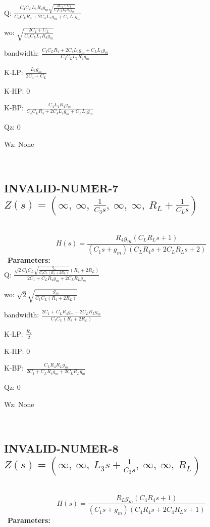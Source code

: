 \documentclass{article}
\begin{document}
Q: $\frac{C_{4} C_{L} L_{1} R_{4} g_{m} \sqrt{\frac{2 C_{4} + C_{L}}{C_{4} C_{L} L_{1} R_{4} g_{m}}}}{C_{4} C_{L} R_{4} + 2 C_{4} L_{1} g_{m} + C_{L} L_{1} g_{m}}$\ 

wo: $\sqrt{\frac{2 C_{4} + C_{L}}{C_{4} C_{L} L_{1} R_{4} g_{m}}}$\ 

bandwidth: $\frac{C_{4} C_{L} R_{4} + 2 C_{4} L_{1} g_{m} + C_{L} L_{1} g_{m}}{C_{4} C_{L} L_{1} R_{4} g_{m}}$\ 

K-LP: $\frac{L_{1} g_{m}}{2 C_{4} + C_{L}}$\ 

K-HP: $0$\ 

K-BP: $\frac{C_{4} L_{1} R_{4} g_{m}}{C_{4} C_{L} R_{4} + 2 C_{4} L_{1} g_{m} + C_{L} L_{1} g_{m}}$\ 

Qz: $0$\ 

Wz: $\text{None}$\ 

\ 

\subsection{INVALID-NUMER-7 $Z(s) = \left( \infty, \  \infty, \  \frac{1}{C_{3} s}, \  \infty, \  \infty, \  R_{L} + \frac{1}{C_{L} s}\right)$ } \ 
\textbf{\[H(s) = \frac{R_{4} g_{m} \left(C_{L} R_{L} s + 1\right)}{\left(C_{1} s + g_{m}\right) \left(C_{L} R_{4} s + 2 C_{L} R_{L} s + 2\right)}\] } \ 
\textbf{Parameters:}\\ 

Q: $\frac{\sqrt{2} C_{1} C_{L} \sqrt{\frac{g_{m}}{C_{1} C_{L} \left(R_{4} + 2 R_{L}\right)}} \left(R_{4} + 2 R_{L}\right)}{2 C_{1} + C_{L} R_{4} g_{m} + 2 C_{L} R_{L} g_{m}}$\ 

wo: $\sqrt{2} \sqrt{\frac{g_{m}}{C_{1} C_{L} \left(R_{4} + 2 R_{L}\right)}}$\ 

bandwidth: $\frac{2 C_{1} + C_{L} R_{4} g_{m} + 2 C_{L} R_{L} g_{m}}{C_{1} C_{L} \left(R_{4} + 2 R_{L}\right)}$\ 

K-LP: $\frac{R_{4}}{2}$\ 

K-HP: $0$\ 

K-BP: $\frac{C_{L} R_{4} R_{L} g_{m}}{2 C_{1} + C_{L} R_{4} g_{m} + 2 C_{L} R_{L} g_{m}}$\ 

Qz: $0$\ 

Wz: $\text{None}$\ 

\ 

\subsection{INVALID-NUMER-8 $Z(s) = \left( \infty, \  \infty, \  L_{3} s + \frac{1}{C_{3} s}, \  \infty, \  \infty, \  R_{L}\right)$ } \ 
\textbf{\[H(s) = \frac{R_{L} g_{m} \left(C_{4} R_{4} s + 1\right)}{\left(C_{1} s + g_{m}\right) \left(C_{4} R_{4} s + 2 C_{4} R_{L} s + 1\right)}\] } \ 
\textbf{Parameters:}\\ 
\end{document}
